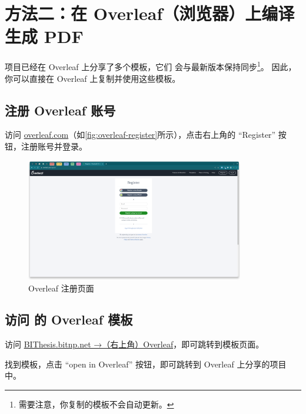 \clearpage
\section{方法二：在 Overleaf（浏览器）上编译生成 PDF}
\label{sec:overleaf-compile}

\BIThesis 项目已经在 Overleaf 上分享了多个模板，它们
会与最新版本保持同步\footnote{需要注意，你复制的模板不会自动更新。}。
因此，你可以直接在 Overleaf 上复制并使用这些模板。

\vspace{\fill}
\subsection{注册 Overleaf 账号}

访问 \href{https://cn.overleaf.com}{overleaf.com}（如\autoref{fig:overleaf-register}所示），点击右上角的 ``Register'' 按钮，注册账号并登录。

\begin{figure}[H]
  \begin{center}
    \includegraphics[width=0.85\textwidth]{imgs/overleaf-register.png}
  \end{center}
  \caption{Overleaf 注册页面}
  \label{fig:overleaf-register}
\end{figure}

\vspace{\fill}
\subsection{访问 \BIThesis 的 Overleaf 模板}

访问 \href{https://bithesis.bitnp.net/guide/preface.html#q-bithesis-都包含哪些模板}{BIThesis.bitnp.net →（右上角）Overleaf}，即可跳转到模板页面。

找到模板，点击 ``open in Overleaf'' 按钮，即可跳转到 Overleaf 上分享的项目中。

